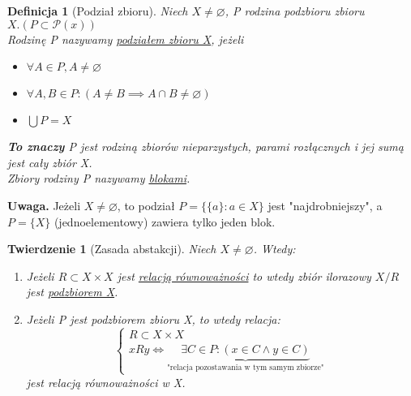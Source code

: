 \documentclass[a5paper,8pt]{article}
\theoremstyle{mythmstyle}
\newtheorem{definition}{Definicja}[section]
\newtheorem{theorem}{Twierdzenie}[section]
\begin{document}
            \begin{definition}[Podział zbioru]
                Niech $ X \neq \varnothing $, P rodzina podzbioru zbioru $ X. (P \subset \mathcal{P}(x)) $\\
                Rodzinę P nazywamy \underline{podziałem zbioru X}, jeżeli

                \begin{itemize}
                    \item $ \forall A \in P, A \neq \varnothing $
                    \item $ \forall A, B \in P : (A \neq B \implies A \cap B \neq \varnothing) $
                    \item $ \bigcup P = X $
                \end{itemize}

                \textbf{To znaczy} P jest rodziną zbiorów nieparzystych, parami rozłącznych
                i jej sumą jest cały zbiór X.\\
                Zbiory rodziny P nazywamy \underline{blokami}.
            \end{definition}

            \textbf{Uwaga.} Jeżeli $ X \neq \varnothing $, to podział $ P = \{ \{ a \} : a \in X \} $
            jest "najdrobniejszy", a $ P = \{ X \} $ (jednoelementowy) zawiera tylko jeden blok.


            \begin{theorem}[Zasada abstakcji]
                Niech $ X \neq \varnothing $. Wtedy:
                \begin{enumerate}
                    \item Jeżeli $ R \subset X \times X $ jest \underline{relacją równoważności}
                    to wtedy zbiór ilorazowy $ X / R $ jest \underline{podzbiorem X}.
                    \item Jeżeli P jest podzbiorem zbioru X, to wtedy relacja:
                    \begin{equation*}
                        \begin{cases}
                            R \subset X \times X\\
                            x R y \iff \underbrace{\exists C \in P : (x \in C \wedge y \in C)}_
                            \text{"relacja pozostawania w tym samym zbiorze"}
                        \end{cases}
                    \end{equation*}
                jest relacją równoważności w X.
                \end{enumerate}
            \end{theorem}
\end{document}

